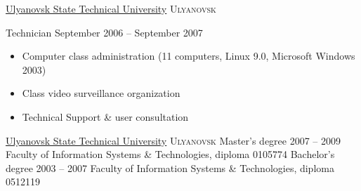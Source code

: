 \documentclass[unicode, 10pt, a4paper, oneside, fleqn]{article}
\begin{document}

\job
    {\href{http://www.ulstu.ru}{Ulyanovsk State Technical University}}
    {\textsc{Ulyanovsk}}
    {
        \position
            {Technician}
            {September 2006 -- September 2007}
            {
                \begin{itemize}
                    \item{Computer class administration (11 computers,
                           Linux 9.0, Microsoft Windows 2003})
                    \item{Class video surveillance organization}
                    \item{Technical Support \& user consultation}
                \end{itemize}
            }
    }



\job
    {\href{http://www.ulstu.ru}{Ulyanovsk State Technical University}}
    {\textsc{Ulyanovsk}}
    {
        \positionnobreak
            {Master's degree}
            {2007 -- 2009}
            {Faculty of Information Systems \& Technologies, diploma  0105774}
        \positionnobreak
            {Bachelor's degree}
            {2003 -- 2007}
            {Faculty of Information Systems \& Technologies, diploma  0512119}
    }

\end{document}
